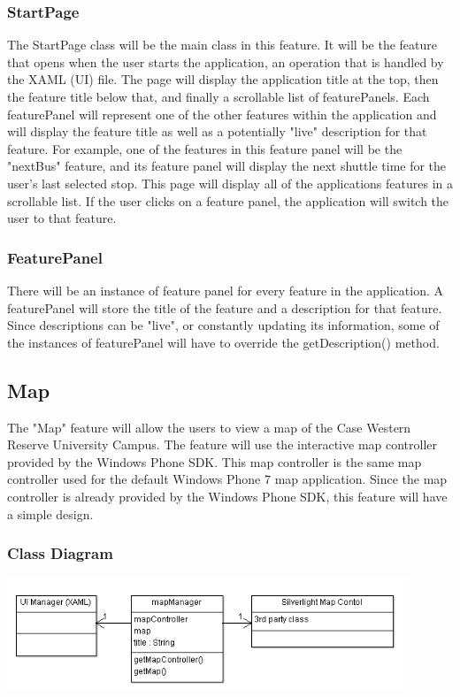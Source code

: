 \documentclass[pdftex,12pt,letter]{article}
\begin{document}
\subsubsection{StartPage}
The StartPage class will be the main class in this feature. It will be the feature that opens when the user starts the application, an operation that is handled by the XAML (UI) file. The page will display the application title at the top, then the feature title below that, and finally a scrollable list of featurePanels. Each featurePanel will represent one of the other features within the application and will display the feature title as well as a potentially "live" description for that feature. For example, one of the features in this feature panel will be the "nextBus" feature, and its feature panel will display the next shuttle time for the user's last selected stop. This page will display all of the applications features in a scrollable list. If the user clicks on a feature panel, the application will switch the user to that feature.
\subsubsection{FeaturePanel}
There will be an instance of feature panel for every feature in the application. A featurePanel will store the title of the feature and a description for that feature. Since descriptions can be "live", or constantly updating its information, some of the instances of featurePanel will have to override the getDescription() method. 
\subsection{Map}
The "Map" feature will allow the users to view a map of the Case Western Reserve University Campus. The feature will use the interactive map controller provided by the Windows Phone SDK. This map controller is the same map controller used for the default Windows Phone 7 map application. Since the map controller is already provided by the Windows Phone SDK, this feature will have a simple design.
\subsubsection{Class Diagram}
\includegraphics[width=120mm]{MapCD.png}
\end{document}
